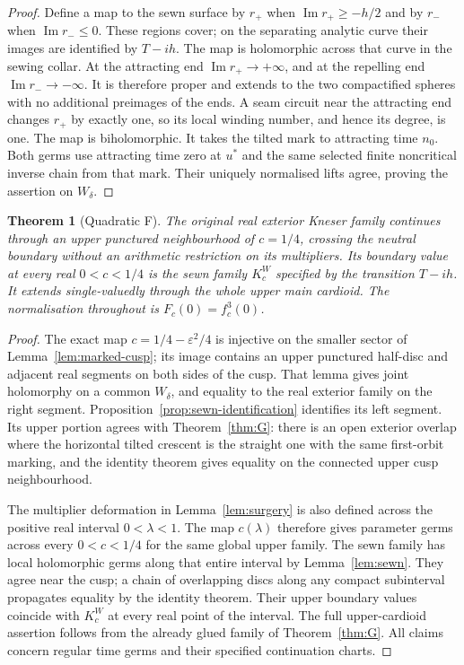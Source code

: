 \documentclass[11pt]{article}
\newtheorem{theorem}{Theorem}
\newcommand{\im}{\operatorname{Im}}
\begin{document}
\begin{proof}
Define a map to the sewn surface by $r_+$ when
$\im r_+\ge-h/2$ and by $r_-$ when $\im r_-\le0$.
These regions cover; on the separating analytic curve their images
are identified by $T-ih$. The map is holomorphic across that curve
in the sewing collar. At the attracting end $\im r_+\to+\infty$,
and at the repelling end $\im r_-\to-\infty$. It is therefore proper
and extends to the two compactified spheres with no additional
preimages of the ends. A seam circuit near the attracting end changes
$r_+$ by exactly one, so its local winding number, and hence its
degree, is one. The map is biholomorphic.
It takes the tilted mark to attracting time $n_0$. Both germs use
attracting time zero at $u^*$ and the same selected finite noncritical
inverse chain from that mark. Their uniquely normalised lifts agree,
proving the assertion on $W_\delta$.
\end{proof}

\begin{theorem}[Quadratic F]\label{thm:F}
The original real exterior Kneser family continues through an upper
punctured neighbourhood of $c=1/4$, crossing the neutral boundary
without an arithmetic restriction on its multipliers. Its boundary
value at every real $0<c<1/4$ is the sewn family $K_c^W$ specified by
the transition $T-ih$. It extends single-valuedly through the whole
upper main cardioid. The normalisation throughout is $F_c(0)=f_c^3(0)$.
\end{theorem}
\begin{proof}
The exact map $c=1/4-\varepsilon^2/4$ is injective on the smaller
sector of Lemma~\ref{lem:marked-cusp}; its image contains an upper
punctured half-disc and adjacent real segments on both sides of the
cusp. That lemma gives joint holomorphy on a common $W_\delta$,
and equality to the real exterior family on the right segment.
Proposition~\ref{prop:sewn-identification} identifies its left segment.
Its upper portion agrees with Theorem~\ref{thm:G}: there is an open
exterior overlap where the horizontal tilted crescent is the straight
one with the same first-orbit marking, and the identity theorem gives
equality on the connected upper cusp neighbourhood.

The multiplier deformation in Lemma~\ref{lem:surgery} is also defined
across the positive real interval $0<\lambda<1$. The map $c(\lambda)$
therefore gives parameter germs across every $0<c<1/4$ for the same
global upper family. The sewn family has local holomorphic germs
along that entire interval by Lemma~\ref{lem:sewn}. They agree near
the cusp; a chain of overlapping discs along any compact subinterval
propagates equality by the identity theorem. Their upper boundary
values coincide with $K_c^W$ at every real point of the interval.
The full upper-cardioid assertion follows from the already glued
family of Theorem~\ref{thm:G}. All claims concern regular time germs
and their specified continuation charts.
\end{proof}
\end{document}
